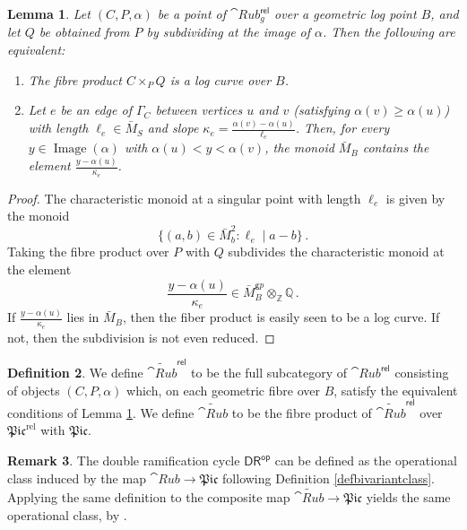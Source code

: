 \documentclass[a4paper,12pt]{article} %
\newcommand{\on}[1]{\operatorname{#1}}
\newcommand{\bb}[1]{{\mathbb{#1}}}
\theoremstyle{definition}
\newtheorem{definition}{Definition} %
\newtheorem{remark}[definition]{Remark}
\theoremstyle{plain}%
\newtheorem{lemma}[definition]{Lemma}
\newcommand{\Picabs}{\mathfrak{Pic}}
\newcommand{\Picrel}{\mathfrak{Pic}^{\mathrm{rel}}}
\newcommand{\DRop}{\mathsf{DR}^{\mathsf{op}}}
\begin{document}
\begin{lemma}\label{lem:divisibility}
Let $(C, P, \alpha)$ be a point of $\cat{Rub}_g^{\mathsf{rel}}$ over a geometric log point $B$, and let $Q$ be obtained from $P$ by subdividing at the image of $\alpha$. Then the following are equivalent:
\begin{enumerate}
\item[(i)]
The fibre product $C \times_P Q$ is a log curve over $B$.
\item[(ii)] Let $e$ be an edge of $\Gamma_C$ between vertices $u$ and $v$ (satisfying $\alpha(v) \ge \alpha (u)$) with length $\ell_e\in \bar M_S$ and slope $\kappa_e = \frac{\alpha(v) - \alpha(u)}{\ell_e}$. Then, for every $y \in \on{Image}(\alpha)$ with $\alpha(u) < y < \alpha(v)$, the monoid $\bar M_{B}$ contains the element $\frac{y - \alpha(u)}{\kappa_e}$. 
\end{enumerate}
\end{lemma}
\begin{proof}
The characteristic monoid at a singular point with length $\ell_e$ is given by the monoid
\begin{equation}
\{(a,b) \in \bar M_b^2 : \ell_e \mid a-b\}\, . 
\end{equation}
Taking the fibre product over $P$ with $Q$ subdivides the characteristic monoid at the element $$\frac{y - \alpha(u)}{\kappa_e} \in \bar M_B^{\mathsf gp} \otimes_{\bb Z} \bb Q\, .$$
If $\frac{y - \alpha(u)}{\kappa_e}$ lies in $\bar M_B$, then the fiber product is easily seen to be a log curve. If not, then the subdivision is not even reduced. 
\end{proof}

\newcommand{\newRub}{\widetilde{\cat{Rub}}}
\newcommand{\newRubrel}{\newRub^{\mathsf{rel}}}
\begin{definition}
We define $\newRubrel$ to be the full subcategory of $\cat{Rub}^{\mathsf{rel}}$ consisting of objects $(C, P, \alpha)$ which, on each geometric fibre over $B$, satisfy the equivalent conditions of Lemma \ref{lem:divisibility}. We define $\newRub$ to be the fibre product of $\newRubrel$ over $\Picrel$ with $\Picabs$. 
\end{definition}

\begin{remark}
The double ramification cycle $\DRop$ can be defined as the operational class induced by the map $\cat{Rub} \to \Picabs$ following Definition \ref{defbivariantclass}. Applying the same definition to the composite map $\widetilde{\cat{Rub}} \to \Picabs$ yields the same operational class, by . 
\end{remark}
\end{document}
